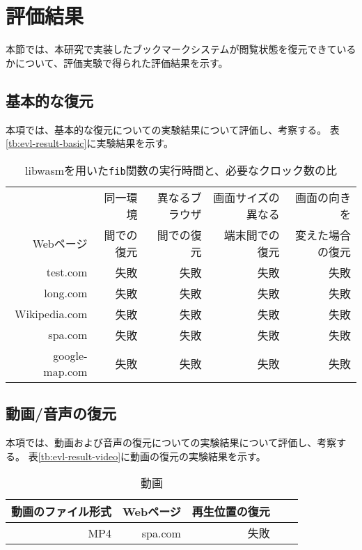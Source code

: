 \section{評価結果}
本節では、本研究で実装したブックマークシステムが閲覧状態を復元できているかについて、評価実験で得られた評価結果を示す。

\subsection{基本的な復元}
本項では、基本的な復元についての実験結果について評価し、考察する。
表\ref{tb:evl-result-basic}に実験結果を示す。

\begin{table}[htbp]
  \caption{libwasmを用いた{\tt fib}関数の実行時間と、必要なクロック数の比}
  \label{tab:evl-result-basic}
  \begin{center}
    \begin{tabular}{rrrrr}
      \hline
      & 同一環境 & 異なるブラウザ & 画面サイズの異なる &  画面の向きを \\
       Webページ & 間での復元 & 間での復元 & 端末間での復元 & 変えた場合の復元 \\ \hline \hline
      test.com & 失敗 & 失敗 &  失敗 & 失敗 \\ \hline
      long.com & 失敗 & 失敗 &  失敗 & 失敗 \\ \hline
      Wikipedia.com & 失敗 & 失敗 &  失敗 & 失敗 \\ \hline
      spa.com & 失敗 & 失敗 &  失敗 & 失敗 \\ \hline
      google-map.com & 失敗 & 失敗 &  失敗 & 失敗 \\ \hline
    \end{tabular}
  \end{center}
\end{table}

\subsection{動画/音声の復元}
本項では、動画および音声の復元についての実験結果について評価し、考察する。
表\ref{tb:evl-result-video}に動画の復元の実験結果を示す。

\begin{table}[htbp]
  \caption{動画}
  \label{tab:evl-result-video}
  \begin{center}
    \begin{tabular}{rrrrr}
      \hline
      動画のファイル形式 & Webページ & 再生位置の復元 \\ \hline \hline
      MP4 & spa.com & 失敗  \\ \hline
    \end{tabular}
  \end{center}
\end{table}

